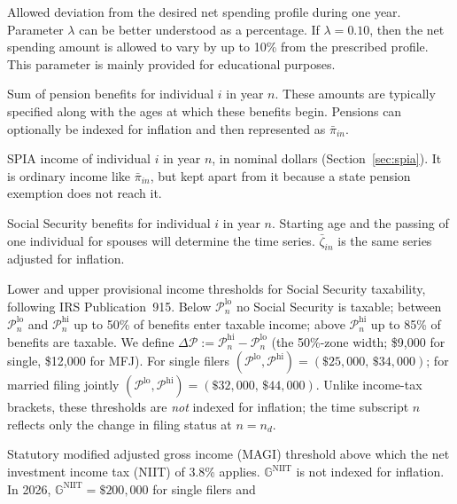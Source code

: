 \documentclass[fleqn,12pt]{report}
\begin{document}
\begin{description}[leftmargin=4em,style=multiline]
\item [$\lambda$]
        Allowed deviation from the desired net spending profile during one year. Parameter
        $\lambda$ can be better understood as a percentage. If $\lambda = 0.10$, then the net spending
	amount is allowed to vary by up to 10\% from the prescribed profile.
	This parameter is mainly provided for educational purposes.

\item [$\pi_{in}$]
	Sum of pension benefits for individual $i$ in year $n$. These amounts are typically
	specified along with the ages at which these benefits begin.
	Pensions can optionally be indexed for inflation and then represented as $\bar{\pi}_{in}$.
\item [$\bar{a}_{in}$]
	SPIA income of individual $i$ in year $n$, in nominal dollars (Section~\ref{sec:spia}).
	It is ordinary income like $\bar{\pi}_{in}$, but kept apart from it because a state
	pension exemption does not reach it.
\item [$\zeta_{in}$]
	Social Security benefits for individual $i$ in year $n$. Starting age and the passing
	of one individual for spouses will determine the time series. $\bar{\zeta}_{in}$ is
	the same series adjusted for inflation.
\item [$\mathcal{P}^{\mathrm{lo}}_n$, $\mathcal{P}^{\mathrm{hi}}_n$, $\Delta\mathcal{P}$]
	Lower and upper provisional income thresholds for Social Security taxability,
	following IRS Publication~915.
	Below $\mathcal{P}^{\mathrm{lo}}_n$ no Social Security is taxable;
	between $\mathcal{P}^{\mathrm{lo}}_n$ and $\mathcal{P}^{\mathrm{hi}}_n$ up to 50\% of benefits
	enter taxable income; above $\mathcal{P}^{\mathrm{hi}}_n$ up to 85\% of benefits are taxable.
	We define $\Delta\mathcal{P} := \mathcal{P}^{\mathrm{hi}}_n - \mathcal{P}^{\mathrm{lo}}_n$
	(the 50\%-zone width; \$9{,}000 for single, \$12{,}000 for MFJ).
	For single filers $(\mathcal{P}^{\mathrm{lo}}, \mathcal{P}^{\mathrm{hi}}) = (\$25{,}000,\, \$34{,}000)$;
	for married filing jointly
	$(\mathcal{P}^{\mathrm{lo}}, \mathcal{P}^{\mathrm{hi}}) = (\$32{,}000,\, \$44{,}000)$.
	Unlike income-tax brackets, these thresholds are \emph{not} indexed for inflation;
	the time subscript $n$ reflects only the change in filing status at $n = n_d$.
\item [$\mathbb{G}^{\mathrm{NIIT}}$]
	Statutory modified adjusted gross income (MAGI) threshold above which the
	net investment income tax (NIIT) of 3.8\% applies.
	$\mathbb{G}^{\mathrm{NIIT}}$ is not indexed for inflation.
	In 2026, $\mathbb{G}^{\mathrm{NIIT}} = \$200{,}000$ for single filers and

\end{description}
\end{document}
